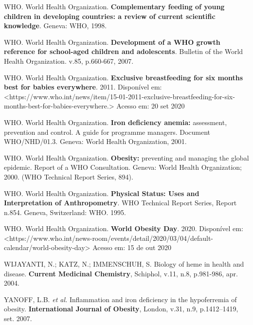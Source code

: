 \bigbreak

\noindent WHO. World Health Organization. \textbf{Complementary feeding of young children in developing countries: a review of current scientific knowledge}. Geneva: WHO, 1998.

\bigbreak

\noindent WHO. World Health Organization. \textbf{Development of a WHO growth reference for school-aged children and adolescents}. Bulletin of the World Health Organization. v.85, p.660-667, 2007. 

\bigbreak

\noindent WHO. World Health Organization. \textbf{Exclusive breastfeeding for six months best for babies everywhere}. 2011. Disponível em: <https://www.who.int/news/item/15-01-2011-exclusive-breastfeeding-for-six-months-best-for-babies-everywhere.> Acesso em: 20 set 2020

\bigbreak

\noindent WHO. World Health Organization. \textbf{Iron deficiency anemia:} assessment, prevention and control. A guide for programme managers. Document WHO/NHD/01.3. Geneva: World Health Organization, 2001.

\bigbreak

\noindent WHO. World Health Organization. \textbf{Obesity:} preventing and managing the global epidemic. Report of a WHO Consultation. Geneva: World Health Organization; 2000. (WHO Technical Report Series, 894).

\bigbreak

\noindent WHO. World Health Organization. \textbf{Physical Status: Uses and Interpretation of Anthropometry}. WHO Technical Report Series, Report n.854. Geneva, Switzerland: WHO. 1995.

\noindent WHO. World Health Organization. \textbf{World Obesity Day}. 2020. Disponível em: <https://www.who.int/news-room/events/detail/2020/03/04/default-calendar/world-obesity-day> Acesso em: 15 de out 2020

\bigbreak

\noindent WIJAYANTI, N.; KATZ, N.; IMMENSCHUH, S. Biology of heme in health and disease. \textbf{Current Medicinal Chemistry}, Schiphol, v.11, n.8, p.981-986, apr. 2004.

\bigbreak

\noindent YANOFF, L.B. \textit{et al.} Inflammation and iron deficiency in the hypoferremia of obesity. \textbf{International Journal of Obesity}, London, v.31, n.9, p.1412–1419, set. 2007. 

\bigbreak

